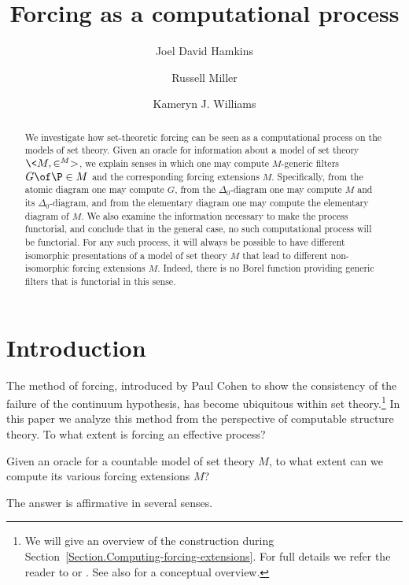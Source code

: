 \documentclass{amsart}
\title{Forcing as a computational process}
\author{Joel David Hamkins}
\author{Russell Miller}
\author{Kameryn J. Williams}
\begin{document}
 
 
 \begin{abstract}
 We investigate how set-theoretic forcing can be seen as a computational process on the models of set theory. Given an oracle for information about a model of set theory $\<M,\in^M>$, we explain senses in which one may compute $M$-generic filters $G\of\P\in M$ and the corresponding forcing extensions $M$. Specifically, from the atomic diagram one may compute $G$, from the $\Delta_0$-diagram one may compute $M$ and its $\Delta_0$-diagram, and from the elementary diagram one may compute the elementary diagram of $M$.
 We also examine the information necessary to make the process functorial, and conclude that in the general case, no such computational process will be functorial. For any such process, it will always be possible to have different isomorphic presentations of a model of set theory $M$ that lead to different non-isomorphic forcing extensions $M$. Indeed, there is no Borel function providing generic filters that is functorial in this sense.
 \end{abstract}
 
 
 \maketitle
 
 
 \section{Introduction}\label{Section.Introduction}
 
 The method of forcing, introduced by Paul Cohen to show the consistency of the failure of the continuum hypothesis,
 has become ubiquitous within set theory.\footnote{We will give an overview of the construction during Section~\ref{Section.Computing-forcing-extensions}. For full details we refer the reader to \cite{Shoenfield1971:UnramifiedForcing} or \cite{Kunen1980:SetTheory}. See also \cite{Chow2007:ABeginnersGuideToForcing} for a conceptual overview.}
 In this paper we analyze this method from the perspective of computable structure theory. To what extent is
 forcing an effective process?
 
 \begin{mainquestion*}
 Given an oracle for a countable model of set theory $M$, to what extent can we compute its various forcing extensions $M$?
 \end{mainquestion*}
 
 The answer is affirmative in several senses.
 
\end{document}
